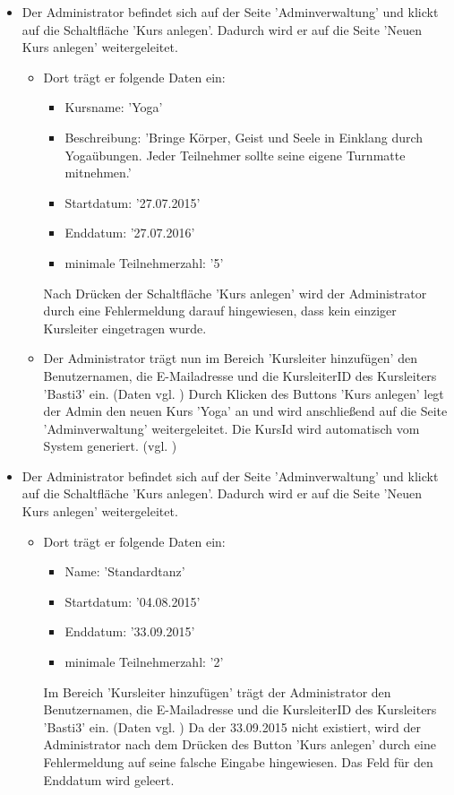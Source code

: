 \documentclass[a4paper]{scrreprt}
\begin{document}
\begin{itemize}
				\item {}
			 	 Der Administrator befindet sich auf der Seite 'Adminverwaltung' und klickt auf die Schaltfläche 'Kurs anlegen'. Dadurch wird er auf die Seite 'Neuen Kurs anlegen' weitergeleitet.
				 	 \begin{itemize} 
					 	 \item Dort trägt er folgende Daten ein:
							\begin{itemize}
								\item Kursname: 'Yoga'
								\item Beschreibung: 'Bringe Körper, Geist und Seele in Einklang durch Yogaübungen. Jeder Teilnehmer sollte seine eigene Turnmatte mitnehmen.'
								\item Startdatum: '27.07.2015'
								\item Enddatum: '27.07.2016'
								\item minimale Teilnehmerzahl: '5'
							\end{itemize}
							Nach Drücken der Schaltfläche 'Kurs anlegen' wird der Administrator durch eine Fehlermeldung darauf hingewiesen, dass kein einziger Kursleiter eingetragen wurde.
							
						 \item Der Administrator trägt nun im Bereich 'Kursleiter hinzufügen' den Benutzernamen, die E-Mailadresse und die KursleiterID des Kursleiters 'Basti3' ein. (Daten vgl. ) Durch Klicken des Buttons 'Kurs anlegen' legt der Admin den neuen Kurs 'Yoga' an und wird anschließend auf die Seite 'Adminverwaltung' weitergeleitet. Die KursId wird automatisch vom System generiert. (vgl. )
					\end{itemize}
					
				\item {}
				 Der Administrator befindet sich auf der Seite 'Adminverwaltung' und klickt auf die Schaltfläche 'Kurs anlegen'. Dadurch wird er auf die Seite 'Neuen Kurs anlegen' weitergeleitet.
					 \begin{itemize}
						\item Dort trägt er folgende Daten ein:
							\begin{itemize}
								\item Name: 'Standardtanz'
								\item Startdatum: '04.08.2015'
								\item Enddatum: '33.09.2015'
								\item minimale Teilnehmerzahl: '2'
							\end{itemize}
						Im Bereich 'Kursleiter hinzufügen' trägt der Administrator den Benutzernamen, die E-Mailadresse und die KursleiterID des Kursleiters 'Basti3' ein. (Daten vgl. ) Da der 33.09.2015 nicht existiert, wird der Administrator nach dem Drücken des Button 'Kurs anlegen' durch eine Fehlermeldung auf seine falsche Eingabe hingewiesen. Das Feld für den Enddatum wird geleert. 
						

\end{itemize}
\end{itemize}
\end{document}
